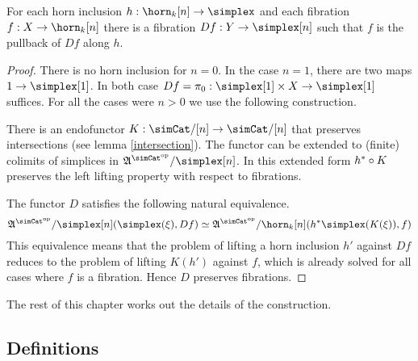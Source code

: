 \documentclass[csh.tex]{subfiles}
\begin{document}
\begin{lemma}[Descent]
For each horn inclusion $h\of \horn_k[n]\to\simplex$ and each fibration $f\of X\to \horn_k[n]$ there is a fibration $Df\of Y\to\simplex[n]$ such that $f$ is the pullback of $Df$ along $h$.
\label{descent}
\end{lemma}

\newcommand\hornInclusion[2]{h^{#1}_{#2}}

\begin{proof} There is no horn inclusion for $n=0$. In the case $n=1$, there are two maps $1\to\simplex[1]$. In both case $Df=\pi_0\of \simplex[1]\times X \to\simplex[1]$ suffices. For all the cases were $n>0$ we use the following construction.


There is an endofunctor $K:\simCat/[n]\to\simCat/[n]$ that preserves intersections (see lemma \ref{intersection}). The functor can be extended to (finite) colimits of simplices in $\ambient\s/\simplex[n]$. In this extended form $h^*\circ K$ preserves the left lifting property with respect to fibrations.%

The functor $D$ satisfies the following natural equivalence.
\[ \ambient\s/\simplex[n](\simplex(\xi), Df)\simeq \ambient\s/\horn_k[n](h\ri \simplex(K(\xi)), f) \]
This equivalence means that the problem of lifting a horn inclusion $h'$ against $Df$ reduces to the problem of lifting $K(h')$ against $f$, which is already solved for all cases where $f$ is a fibration. Hence $D$ preserves fibrations.
\end{proof}

The rest of this chapter works out the details of the construction.

\newcommand\pdmc{\mathbf p}
\newcommand\partar\rightharpoonup
\subsection{Definitions}
\end{document}

